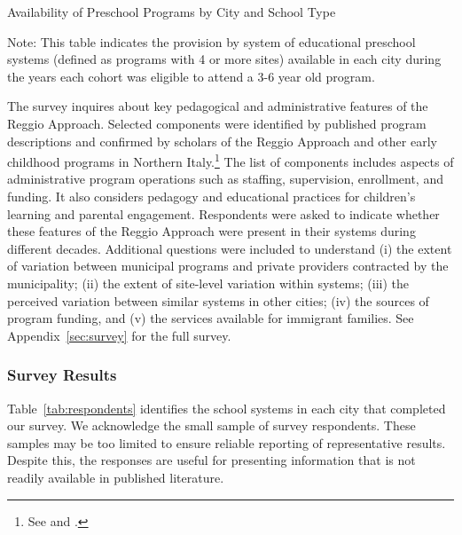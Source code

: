 \begin{table}[H]
\centering
\caption{Availability of Preschool Programs by City and School Type}\label{tab:pre}
\begin{adjustbox}{width=\textwidth}
\begin{threeparttable}
	
\begin{tablenotes}
Note: This table indicates the provision by system of educational preschool systems (defined as programs with 4 or more sites) available in each city during the years each cohort was eligible to attend a 3-6 year old program. 
\end{tablenotes}
\end{threeparttable}
\end{adjustbox}
\end{table}

The survey inquires about key pedagogical and administrative features of the Reggio Approach. Selected components were identified by published program descriptions and confirmed by scholars of the Reggio Approach and other early childhood programs in Northern Italy.\footnote{See \citet{Edwards-etal-eds_1998_Hundred-Languages} and \citet{Corsaro_2008_Policy-Practice}.} The list of components includes aspects of administrative program operations such as staffing, supervision, enrollment, and funding. It also considers pedagogy and educational practices for children's learning and parental engagement. Respondents were asked to indicate whether these features of the Reggio Approach were present in their systems during different decades. Additional questions were included to understand (i) the extent of variation between municipal programs and private providers contracted by the municipality; (ii) the extent of site-level variation within systems; (iii) the perceived variation between similar systems in other cities; (iv) the sources of program funding, and (v) the services available for immigrant families. See Appendix~\ref{sec:survey} for the full survey. 

\subsubsection{Survey Results}

Table~\ref{tab:respondents} identifies the school systems in each city that completed our survey. We acknowledge the small sample of survey respondents. These samples may be too limited to ensure reliable reporting of representative results. Despite this, the responses are useful for presenting information that is not readily available in published literature.

